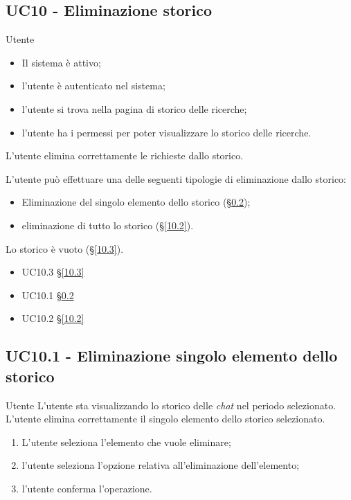 \subsection{UC10 - Eliminazione storico}
\label{10}
{Utente}
{
    \begin{itemize}
        \item Il sistema è attivo;
        \item l'utente è autenticato nel sistema;
        \item l'utente si trova nella pagina di storico delle ricerche;
        \item l'utente ha i permessi per poter visualizzare lo storico delle ricerche.
    \end{itemize}
}
{
    L'utente elimina correttamente le richieste dallo storico.
}
{
    L'utente può effettuare una delle seguenti tipologie di eliminazione dallo storico:
    \begin{itemize}
        \item Eliminazione del singolo elemento dello storico (§\ref{10.1});
        \item eliminazione di tutto lo storico (§\ref{10.2}).
    \end{itemize}
}
{}
{
    Lo storico è vuoto (§\ref{10.3}).
}
{
    \begin{itemize}
        \item UC10.3 §\ref{10.3}
    \end{itemize}
}
{
    \begin{itemize}
        \item UC10.1 §\ref{10.1}
        \item UC10.2 §\ref{10.2}
    \end{itemize}
}

\subsection{UC10.1 - Eliminazione singolo elemento dello storico}
\label{10.1}
\makeUC{}
{Utente}
{L'utente sta visualizzando lo storico delle \textit{chat} nel periodo selezionato.}
{L'utente elimina correttamente il singolo elemento dello storico selezionato.}
{
    \begin{enumerate}
        \item L'utente seleziona l'elemento che vuole eliminare;
        \item l'utente seleziona l'opzione relativa all'eliminazione dell'elemento;
        \item l'utente conferma l'operazione.
    \end{enumerate}
}{}{}{}{}

